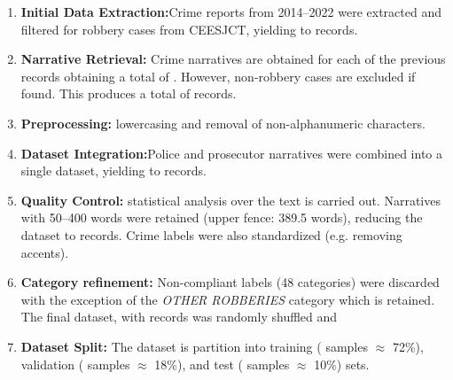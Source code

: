 \documentclass[runningheads]{llncs}
\newcommand{\printInicialesComision}{CEESJCT}
\begin{document}
\begin{enumerate}
\item \textbf{Initial Data Extraction:}Crime reports from 2014–2022 were extracted and filtered for
  robbery cases from \printInicialesComision, yielding to
   records.
  \item \textbf{Narrative Retrieval:} Crime narratives are obtained
    for each of the previous records obtaining a total of
    . However, non-robbery cases are excluded if
    found. This produces a total of  records.
  \item \textbf{Preprocessing:} lowercasing and removal of
    non-alphanumeric characters.
  \item \textbf{Dataset Integration:}Police and prosecutor narratives
    were combined into a single dataset, yielding to
     records.
  \item \textbf{Quality Control:} statistical analysis over the text
    is carried out. Narratives with 50–400 words were retained (upper
    fence: 389.5 words), reducing the dataset to 
    records. Crime labels were also standardized (e.g. removing accents).
  \item \textbf{Category refinement:} Non-compliant labels (48
    categories) were discarded with the exception of the
    \textit{OTHER ROBBERIES} category which is retained. The final dataset, with
     records was randomly shuffled and
  \item \textbf{Dataset Split:} The dataset is partition into training
    ( samples $\approx$ 72\%), validation
    ( samples  $\approx$ 18\%),  and test
    ( samples $\approx$ 10\%) sets.
\end{enumerate}
\end{document}
